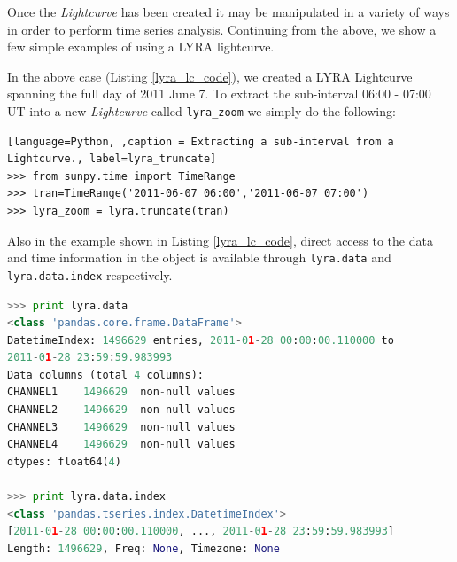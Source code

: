 Once the \textit{Lightcurve} has been created it may be manipulated in a variety of ways in order to perform time series analysis. Continuing from the above, we show a few simple examples of using a LYRA lightcurve. 

In the above case (Listing \ref{lyra_lc_code}), we created a LYRA Lightcurve spanning the full day of 2011 June 7. To extract the sub-interval 06:00 - 07:00 UT into a new \textit{Lightcurve} called \verb|lyra_zoom| we simply do the following:

\begin{lstlisting}[language=Python, ,caption = Extracting a sub-interval from a Lightcurve., label=lyra_truncate]
>>> from sunpy.time import TimeRange
>>> tran=TimeRange('2011-06-07 06:00','2011-06-07 07:00')
>>> lyra_zoom = lyra.truncate(tran)

\end{lstlisting}

Also in the example shown in Listing \ref{lyra_lc_code}, direct access to the data and time information in the object is available through \verb|lyra.data| and \verb|lyra.data.index| respectively.

\begin{lstlisting}[language=Python, caption = Accessing the data and time axis in a Lightcurve]
>>> print lyra.data
<class 'pandas.core.frame.DataFrame'>
DatetimeIndex: 1496629 entries, 2011-01-28 00:00:00.110000 to 
2011-01-28 23:59:59.983993
Data columns (total 4 columns):
CHANNEL1    1496629  non-null values
CHANNEL2    1496629  non-null values
CHANNEL3    1496629  non-null values
CHANNEL4    1496629  non-null values
dtypes: float64(4)

>>> print lyra.data.index
<class 'pandas.tseries.index.DatetimeIndex'>
[2011-01-28 00:00:00.110000, ..., 2011-01-28 23:59:59.983993]
Length: 1496629, Freq: None, Timezone: None
\end{lstlisting}

